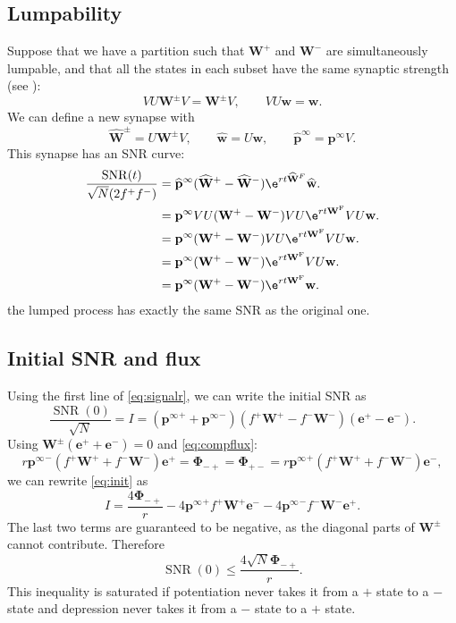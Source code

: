 \documentclass[12pt]{article}
\newcommand{\onev}{\mathbf{e}}
\newcommand{\eq}{\mathbf{p}^\infty}
\newcommand{\w}{\mathbf{w}}
\newcommand{\W}{\mathbf{W}}
\newcommand{\frg}{\W^{\mathrm{F}}}
\newcommand{\F}{\boldsymbol{\Phi}}
\DeclareMathOperator{\SNR}{SNR}
\begin{document}
\subsection{Lumpability}\label{sec:SNRlump}

Suppose that we have a partition such that $\W^+$ and $\W^-$ are simultaneously lumpable, and that all the states in each subset have the same synaptic strength (see ):
%
\begin{equation}\label{eq:lumpablesynapse}
  VU\W^\pm V = \W^\pm V,
  \qquad
  VU\w=\w.
\end{equation}
%
We can define a new synapse with
%
\begin{equation}\label{eq:lumpedsynapse}
  \widehat{\W}^\pm = U\W^\pm V,
  \qquad
  \widehat{\w} = U \w,
  \qquad
  \widehat{\mathbf{p}}^\infty = \eq V.
\end{equation}
%
This synapse has an SNR curve:
%
\begin{equation}\label{eq:lumpedSNR}
  \begin{aligned}
    \frac{\SNR(t)}{\sqrt{N} (2f^+f^-)} &=  \widehat{\mathbf{p}}^\infty (\widehat{\W}^+ - \widehat{\W}^-)\e^{rt\widehat{\W}^F}\widehat{\w}. \\
      &= \eq VU (\W^+ - \W^-) VU \e^{rt\frg} VU \w. \\
      &= \eq (\W^+ - \W^-) VU \e^{rt\frg} VU \w. \\
      &= \eq (\W^+ - \W^-)\e^{rt\frg} VU \w. \\
      &= \eq (\W^+ - \W^-)\e^{rt\frg}\w. \\
  \end{aligned}
\end{equation}
%
\ie the lumped process has exactly the same SNR as the original one.


\subsection{Initial SNR and flux}\label{sec:initflux}

Using the first line of \eqref{eq:signalr}, we can write the initial SNR as
%
\begin{equation}\label{eq:init}
  \frac{\SNR(0)}{\sqrt{N}} = I = ({\eq}^++{\eq}^-)(f^+\W^+-f^-\W^-)(\onev^+-\onev^-).
\end{equation}
%
Using $\W^\pm(\onev^++\onev^-)=0$ and \eqref{eq:compflux}:
%
\begin{equation*}
  r{\eq}^-(f^+\W^++f^-\W^-)\onev^+ = \F_{-+} = \F_{+-} = r{\eq}^+(f^+\W^++f^-\W^-)\onev^-,
\end{equation*}
%
we can rewrite \eqref{eq:init} as
%
\begin{equation}\label{eq:initflux}
  I = \frac{4\F_{-+}}{r} - 4{\eq}^+f^+\W^+\onev^- - 4{\eq}^-f^-\W^-\onev^+.
\end{equation}
%
The last two terms are guaranteed to be negative, as the diagonal parts of $\W^\pm$ cannot contribute.
Therefore
%
\begin{equation}\label{eq:initfluxineq}
  \SNR(0) \leq \frac{4\sqrt{N}\F_{-+}}{r}.
\end{equation}
%
This inequality is saturated if potentiation never takes it from a $+$ state to a $-$ state and depression never takes it from a $-$ state to a $+$ state.
\end{document}
